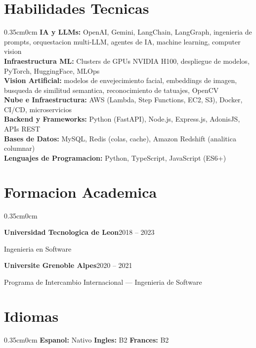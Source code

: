 \documentclass[a4paper, 10pt]{article}
\newcommand{\entryheader}[2]{
  \par\noindent\textbf{#1}\hfill#2\par
}
\begin{document}
\section{Habilidades Tecnicas}
\begin{adjustwidth}{0.35cm}{0cm}
\textbf{IA y LLMs:} OpenAI, Gemini, LangChain, LangGraph, ingenieria de prompts, orquestacion multi-LLM, agentes de IA, machine learning, computer vision \\[2pt]
\textbf{Infraestructura ML:} Clusters de GPUs NVIDIA H100, despliegue de modelos, PyTorch, HuggingFace, MLOps \\[2pt]
\textbf{Vision Artificial:} modelos de envejecimiento facial, embeddings de imagen, busqueda de similitud semantica, reconocimiento de tatuajes, OpenCV \\[2pt]
\textbf{Nube e Infraestructura:} AWS (Lambda, Step Functions, EC2, S3), Docker, CI/CD, microservicios \\[2pt]
\textbf{Backend y Frameworks:} Python (FastAPI), Node.js, Express.js, AdonisJS, APIs REST \\[2pt]
\textbf{Bases de Datos:} MySQL, Redis (colas, cache), Amazon Redshift (analitica columnar) \\[2pt]
\textbf{Lenguajes de Programacion:} Python, TypeScript, JavaScript (ES6+)
\end{adjustwidth}

\section{Formacion Academica}
\begin{adjustwidth}{0.35cm}{0cm}
\entryheader{Universidad Tecnologica de Leon}{2018 -- 2023}
Ingenieria en Software

\vspace{0.1cm}

\entryheader{Universite Grenoble Alpes}{2020 -- 2021}
Programa de Intercambio Internacional --- Ingenieria de Software
\end{adjustwidth}

\section{Idiomas}
\begin{adjustwidth}{0.35cm}{0cm}
\textbf{Espanol:} Nativo \quad \textbf{Ingles:} B2 \quad \textbf{Frances:} B2
\end{adjustwidth}
\end{document}
